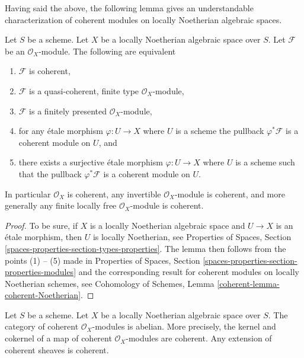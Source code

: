 \medskip\noindent
Having said the above, the following lemma gives an understandable
characterization of coherent modules on locally Noetherian algebraic
spaces.

\begin{lemma}
\label{lemma-coherent-Noetherian}
Let $S$ be a scheme.
Let $X$ be a locally Noetherian algebraic space over $S$.
Let $\mathcal{F}$ be an $\mathcal{O}_X$-module.
The following are equivalent
\begin{enumerate}
\item $\mathcal{F}$ is coherent,
\item $\mathcal{F}$ is a quasi-coherent, finite type $\mathcal{O}_X$-module,
\item $\mathcal{F}$ is a finitely presented $\mathcal{O}_X$-module,
\item for any \'etale morphism $\varphi : U \to X$ where $U$ is a scheme
the pullback $\varphi^*\mathcal{F}$ is a coherent module on $U$, and
\item there exists a surjective \'etale morphism $\varphi : U \to X$
where $U$ is a scheme such that the pullback $\varphi^*\mathcal{F}$ is
a coherent module on $U$.
\end{enumerate}
In particular $\mathcal{O}_X$ is coherent, any invertible
$\mathcal{O}_X$-module is coherent, and more generally any
finite locally free $\mathcal{O}_X$-module is coherent.
\end{lemma}

\begin{proof}
To be sure, if $X$ is a locally Noetherian algebraic space and
$U \to X$ is an \'etale morphism, then $U$ is locally Noetherian, see
Properties of Spaces, Section \ref{spaces-properties-section-types-properties}.
The lemma then follows from the points (1) -- (5) made in
Properties of Spaces, Section \ref{spaces-properties-section-properties-modules}
and the corresponding result for coherent modules on locally
Noetherian schemes, see
Cohomology of Schemes, Lemma \ref{coherent-lemma-coherent-Noetherian}.
\end{proof}

\begin{lemma}
\label{lemma-coherent-abelian-Noetherian}
Let $S$ be a scheme. Let $X$ be a locally Noetherian algebraic space over $S$.
The category of coherent $\mathcal{O}_X$-modules is abelian. More precisely,
the kernel and cokernel of a map of coherent $\mathcal{O}_X$-modules are
coherent. Any extension of coherent sheaves is coherent.
\end{lemma}

